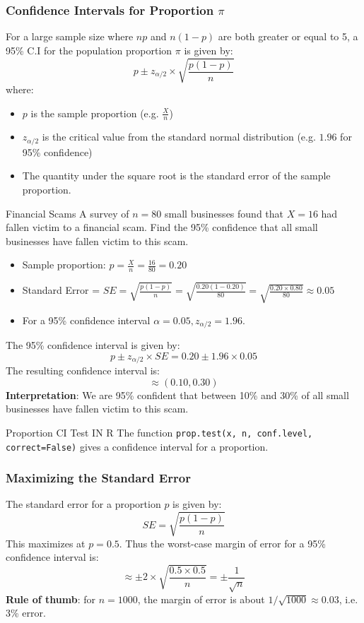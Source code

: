 \documentclass[10pt]{extarticle}
\begin{document}
\subsubsection{Confidence Intervals for Proportion $\pi$}
For a large sample size where $np$ and $n(1-p)$ are both greater or equal to 5, a 95\% C.I for the population proportion $\pi$ is given by:
$$p \pm z_{\alpha/2} \times \sqrt{\frac{p(1 - p)}{n}}$$
where:
\begin{itemize}
    \item $p$ is the sample proportion (e.g. $\frac{X}{n}$)
    \item $z_{\alpha/2}$ is the critical value from the standard normal distribution (e.g. $1.96$ for 95\% confidence)
    \item The quantity under the square root is the standard error of the sample proportion.
\end{itemize}

\begin{examplebox}{Financial Scams}{}
    A survey of $n=80$ small businesses found that $X = 16$ had fallen victim to a financial scam. Find the 95\% confidence that all small businesses have fallen victim to this scam. \\[2ex]

    \begin{itemize}
        \item Sample proportion: $p = \frac{X}{n} = \frac{16}{80} = 0.20$
        \item Standard Error = $SE = \sqrt{\frac{p(1 - p)}{n}} = \sqrt{\frac{0.20(1 - 0.20)}{80}} = \sqrt{\frac{0.20 \times 0.80}{80}} \approx 0.05$
        \item For a 95\% confidence interval $\alpha = 0.05, z_{\alpha/2} = 1.96$.
    \end{itemize}
    The 95\% confidence interval is given by:
    $$p \pm z_{\alpha/2} \times SE = 0.20 \pm 1.96 \times 0.05$$
    The resulting confidence interval is:
    $$\approx (0.10, 0.30)$$
    \textbf{Interpretation}: We are 95\% confident that between 10\% and 30\% of all small businesses have fallen victim to this scam.
\end{examplebox}
\begin{conceptbox}{Proportion CI Test IN R}{}
    The function \texttt{prop.test(x, n, conf.level, correct=False)}  gives a confidence interval for a proportion.
\end{conceptbox}
\pagebreak
\subsubsection{Maximizing the Standard Error}
The standard error for a proportion $p$ is given by:
$$SE = \sqrt{\frac{p(1 - p)}{n}}$$
This maximizes at $p = 0.5$. Thus the worst-case margin of error for a 95\% confidence interval is:
$$\approx \pm 2 \times \sqrt{\frac{0.5\times0.5}{n}} = \pm \frac{1}{\sqrt{n}}$$
\textbf{Rule of thumb}: for $n = 1000$, the margin of error is about $1/\sqrt{1000} \approx 0.03$, i.e. 3\% error.
\end{document}
